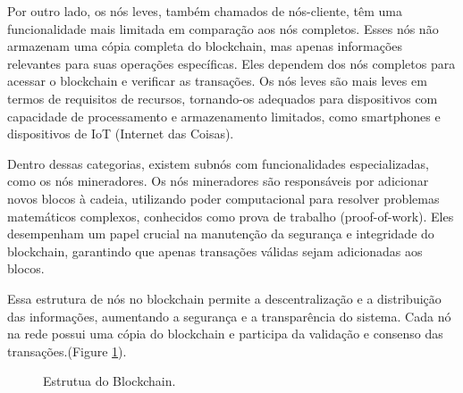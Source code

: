 Por outro lado, os nós leves, também chamados de nós-cliente, têm uma funcionalidade mais limitada em comparação aos nós completos. Esses nós não armazenam uma cópia completa do blockchain, mas apenas informações relevantes para suas operações específicas. Eles dependem dos nós completos para acessar o blockchain e verificar as transações. Os nós leves são mais leves em termos de requisitos de recursos, tornando-os adequados para dispositivos com capacidade de processamento e armazenamento limitados, como smartphones e dispositivos de IoT (Internet das Coisas).

Dentro dessas categorias, existem subnós com funcionalidades especializadas, como os nós mineradores. Os nós mineradores são responsáveis por adicionar novos blocos à cadeia, utilizando poder computacional para resolver problemas matemáticos complexos, conhecidos como prova de trabalho (proof-of-work). Eles desempenham um papel crucial na manutenção da segurança e integridade do blockchain, garantindo que apenas transações válidas sejam adicionadas aos blocos.

Essa estrutura de nós no blockchain permite a descentralização e a distribuição das informações, aumentando a segurança e a transparência do sistema. Cada nó na rede possui uma cópia do blockchain e participa da validação e consenso das transações.(Figure \ref{Blockchain-Nodes}).


\begin{figure}[!htb]
\centering
{}
\caption{Estrutua do Blockchain.}
\label{Blockchain-Nodes}
\end{figure}

